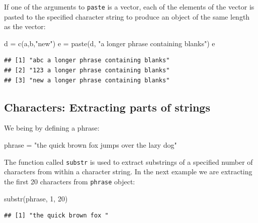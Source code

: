 \documentclass[
]{book}
\newenvironment{Shaded}{\begin{snugshade}}{\end{snugshade}}
\newcommand{\DecValTok}[1]{\textcolor[rgb]{0.00,0.00,0.81}{#1}}
\newcommand{\FunctionTok}[1]{\textcolor[rgb]{0.00,0.00,0.00}{#1}}
\newcommand{\NormalTok}[1]{#1}
\newcommand{\OtherTok}[1]{\textcolor[rgb]{0.56,0.35,0.01}{#1}}
\newcommand{\StringTok}[1]{\textcolor[rgb]{0.31,0.60,0.02}{#1}}
\begin{document}
If one of the arguments to \texttt{paste} is a vector, each of the elements of the vector is pasted to the specified character string to produce an object of the same length as the vector:

\begin{Shaded}
\begin{Highlighting}[]
\NormalTok{d }\OtherTok{=} \FunctionTok{c}\NormalTok{(a,b,}\StringTok{"new"}\NormalTok{)}
\NormalTok{e }\OtherTok{=} \FunctionTok{paste}\NormalTok{(d, }\StringTok{"a longer phrase containing blanks"}\NormalTok{)}
\NormalTok{e}
\end{Highlighting}
\end{Shaded}

\begin{verbatim}
## [1] "abc a longer phrase containing blanks"
## [2] "123 a longer phrase containing blanks"
## [3] "new a longer phrase containing blanks"
\end{verbatim}

\hypertarget{characters-extracting-parts-of-strings}{%
\subsection{Characters: Extracting parts of strings}\label{characters-extracting-parts-of-strings}}

We being by defining a phrase:

\begin{Shaded}
\begin{Highlighting}[]
\NormalTok{phrase }\OtherTok{=} \StringTok{"the quick brown fox jumps over the lazy dog"}
\end{Highlighting}
\end{Shaded}

The function called \texttt{substr} is used to extract substrings of a specified number of characters from within a character string. In the next example we are extracting the first 20 characters from \texttt{phrase} object:

\begin{Shaded}
\begin{Highlighting}[]
\FunctionTok{substr}\NormalTok{(phrase, }\DecValTok{1}\NormalTok{, }\DecValTok{20}\NormalTok{)}
\end{Highlighting}
\end{Shaded}

\begin{verbatim}
## [1] "the quick brown fox "
\end{verbatim}
\end{document}

